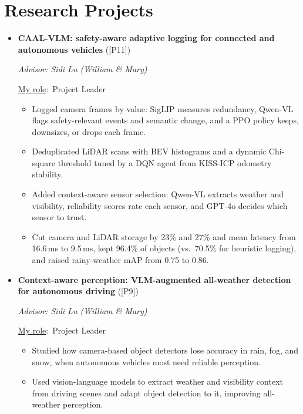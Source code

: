 \documentclass[11pt,letterpaper]{article}
\newenvironment{numbered}[1][3.1em]
  {\begin{itemize}[leftmargin=#1, labelwidth=\dimexpr#1-0.5em\relax,
                   labelsep=0.5em, align=left, itemsep=3pt, topsep=2pt]}
  {\end{itemize}}
\newcommand{\myrole}{\underline{My role}:}
\begin{document}
\section{Research Projects}
\begin{numbered}[2.2em]
  \item[{[5]}] {\raggedright \textbf{CAAL-VLM: safety-aware adaptive logging for connected and
    autonomous vehicles} ([P11])\par}\nobreak
    \textit{Advisor: Sidi Lu (William \& Mary)}\par\nobreak
    \myrole\ Project Leader
    \begin{itemize}
      \item Logged camera frames by value: SigLIP measures redundancy, Qwen-VL
        flags safety-relevant events and semantic change, and a PPO policy keeps,
        downsizes, or drops each frame.
      \item Deduplicated LiDAR scans with BEV histograms and a dynamic
        Chi-square threshold tuned by a DQN agent from KISS-ICP odometry
        stability.
      \item Added context-aware sensor selection: Qwen-VL extracts weather and
        visibility, reliability scores rate each sensor, and GPT-4o decides which
        sensor to trust.
      \item Cut camera and LiDAR storage by 23\% and 27\% and mean latency from
        16.6\,ms to 9.5\,ms, kept 96.4\% of objects (vs.\ 70.5\% for heuristic
        logging), and raised rainy-weather mAP from 0.75 to 0.86.
    \end{itemize}
  \item[{[4]}] {\raggedright \textbf{Context-aware perception: VLM-augmented all-weather
    detection for autonomous driving} ([P9])\par}\nobreak
    \textit{Advisor: Sidi Lu (William \& Mary)}\par\nobreak
    \myrole\ Project Leader
    \begin{itemize}
      \item Studied how camera-based object detectors lose accuracy in rain, fog,
        and snow, when autonomous vehicles most need reliable perception.
      \item Used vision-language models to extract weather and visibility context
        from driving scenes and adapt object detection to it, improving
        all-weather perception.
    \end{itemize}


\end{numbered}
\end{document}
